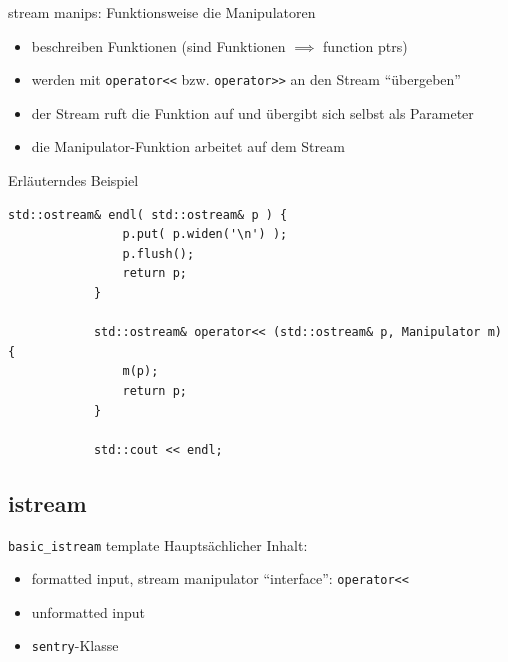 \begin{frame}[fragile]{stream manips: Funktionsweise}
	\footnotesize
	die Manipulatoren
	\begin{itemize}
		\item beschreiben Funktionen (sind Funktionen $\implies$ function ptrs)
		\item werden mit \texttt{operator<<} bzw. \texttt{operator>>} an den Stream \enquote{übergeben}
		\item der Stream ruft die Funktion auf und übergibt sich selbst als Parameter
		\item die Manipulator-Funktion arbeitet auf dem Stream
	\end{itemize}
	
	\pause
	
	\begin{block}{Erläuterndes Beispiel}
		\begin{lstlisting}[basicstyle=\tiny, xleftmargin=3em]
			std::ostream& endl( std::ostream& p ) {
			    p.put( p.widen('\n') );
			    p.flush();
			    return p;
			}
			
			std::ostream& operator<< (std::ostream& p, Manipulator m) {
			    m(p);
			    return p;
			}
			
			std::cout << endl;
		\end{lstlisting}
	\end{block}
\end{frame}


\subsection{istream}

\begin{frame}{\texttt{basic\_istream} template}
	Hauptsächlicher Inhalt:
	\begin{itemize}
		\item formatted input, stream manipulator \enquote{interface}: \texttt{operator<<}
		\item unformatted input
		\item \texttt{sentry}-Klasse
	\end{itemize}
\end{frame}

